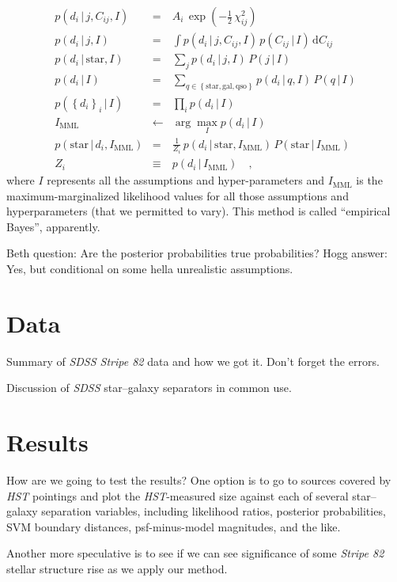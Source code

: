 \documentclass[12pt]{article}
\newcommand{\project}[1]{\textsl{#1}}
\newcommand{\given}{\,|\,}
\newcommand{\dd}{\mathrm{d}}
\newcommand{\setofall}[1]{\left\{{#1}\right\}}
\renewcommand{\star}{\mathrm{star}}
\newcommand{\galaxy}{\mathrm{gal}}
\newcommand{\quasar}{\mathrm{qso}}
\newcommand{\mml}{\mathrm{MML}}
\begin{document}
\begin{eqnarray}
p(d_i\given j,C_{ij},I) &=& A_i\,\exp(-\frac{1}{2}\,\chi^2_{ij})
\\
p(d_i\given j,I) &=& \int p(d_i\given j,C_{ij},I)\,p(C_{ij}\given I)\,\dd C_{ij}
\\
p(d_i\given \star,I) &=& \sum_j p(d_i\given j,I)\,P(j\given I)
\\
p(d_i\given I) &=& \sum_{q\in\setofall{\star,\galaxy,\quasar}} p(d_i\given q,I)\,P(q\given I)
\\
p(\setofall{d_i}_i\given I) &=& \prod_i p(d_i\given I)
\\
I_{\mml} &\leftarrow& \arg\max_I p(d_i\given I)
\\
p(\star\given d_i,I_{\mml}) &=& \frac{1}{Z_i}\,p(d_i\given \star,I_{\mml})\,P(\star\given I_{\mml})
\\
Z_i &\equiv& p(d_i\given I_{\mml})
\quad ,
\end{eqnarray}
where $I$ represents all the assumptions and hyper-parameters and
$I_{\mml}$ is the maximum-marginalized likelihood values for all those
assumptions and hyperparameters (that we permitted to vary).  This
method is called ``empirical Bayes'', apparently.

Beth question: Are the posterior probabilities true probabilities?
Hogg answer: Yes, but conditional on some hella unrealistic
assumptions.

\section{Data}

Summary of \project{SDSS Stripe 82} data and how we got it.  Don't
forget the errors.

Discussion of \project{SDSS} star--galaxy separators in common use.

\section{Results}

How are we going to test the results?  One option is to go to sources
covered by \project{HST} pointings and plot the \project{HST}-measured
size against each of several star--galaxy separation variables,
including likelihood ratios, posterior probabilities, SVM boundary
distances, psf-minus-model magnitudes, and the like.

Another more speculative is to see if we can see significance of some
\project{Stripe 82} stellar structure rise as we apply our method.
\end{document}
